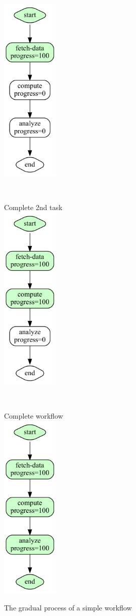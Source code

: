 \begin{figure}[htb]
{\begin{minipage}[b]{0.18\textwidth}
\includegraphics[height=9cm]{images/workflow-example-2.pdf}
\end{minipage} \ \
\begin{minipage}[b]{0.18\textwidth}
Complete 2nd task \\
\includegraphics[height=9cm]{images/workflow-example-3.pdf}
\end{minipage} \ \
\begin{minipage}[b]{0.18\textwidth}
Complete workflow \\
\includegraphics[height=9cm]{images/workflow-example-5.pdf}
\end{minipage} 
}
\caption{The gradual process of a simple workflow}\label{fig:workflow-process}
\end{figure}


